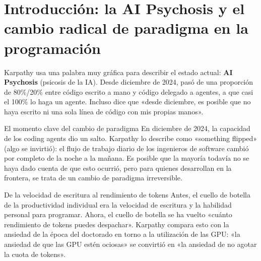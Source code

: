 \section{Introducción: la AI Psychosis y el cambio radical de paradigma en la programación}

Karpathy usa una palabra muy gráfica para describir el estado actual: \textbf{AI Psychosis} (psicosis de la IA). Desde diciembre de 2024, pasó de una proporción de 80\%/20\% entre código escrito a mano y código delegado a agentes, a que casi el 100\% lo haga un agente. Incluso dice que «desde diciembre, es posible que no haya escrito ni una sola línea de código con mis propias manos».

\begin{importantbox}{El momento clave del cambio de paradigma}
En diciembre de 2024, la capacidad de los coding agents dio un salto. Karpathy lo describe como «something flipped» (algo se invirtió): el flujo de trabajo diario de los ingenieros de software cambió por completo de la noche a la mañana. Es posible que la mayoría todavía no se haya dado cuenta de que esto ocurrió, pero para quienes desarrollan en la frontera, se trata de un cambio de paradigma irreversible.
\end{importantbox}

\begin{knowledgebox}{De la velocidad de escritura al rendimiento de tokens}
Antes, el cuello de botella de la productividad individual era la velocidad de escritura y la habilidad personal para programar. Ahora, el cuello de botella se ha vuelto «cuánto rendimiento de tokens puedes despachar». Karpathy compara esto con la ansiedad de la época del doctorado en torno a la utilización de las GPU: «la ansiedad de que las GPU estén ociosas» se convirtió en «la ansiedad de no agotar la cuota de tokens».
\end{knowledgebox}

